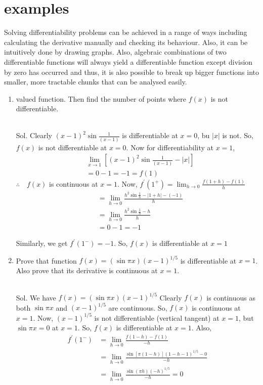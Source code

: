 \section{examples}

Solving differentiability problems can be achieved in a range of ways including calculating the derivative manually and checking its behaviour. Also, it can be intuitively done by drawing graphs. Also, algebraic combinations of two differentiable functions will always yield a differentiable function except division by zero has occurred and thus, it is also possible to break up bigger functions into smaller, more tractable chunks that can be analysed easily. 

\begin{enumerate}
\item valued function. Then find the number of points where $f(x)$ is not differentiable.\\\\


\begin{outline}
    Sol. Clearly $(x-1)^2 \sin \frac{1}{(x-1)}$ is differentiable at $x=0$, bu $|x|$ is not.
So, $f(x)$ is not differentiable at $x=0$.
Now for differentiability at $x=1$,
$$
\begin{aligned}
& \lim _{x \rightarrow 1}\left[(x-1)^2 \sin \frac{1}{(x-1)}-|x|\right] \\
& =0-1=-1=f(1)
\end{aligned}
$$
$\therefore \quad f(x)$ is continuous at $x=1$.
Now, $f^{\prime}\left(1^{+}\right)=\lim _{h \rightarrow 0} \frac{f(1+h)-f(1)}{h}$
$$
\begin{aligned}
& =\lim _{h \rightarrow 0} \frac{h^2 \sin \frac{1}{h}-|1+h|-(-1)}{h} \\
& =\lim _{h \rightarrow 0} \frac{h^2 \sin \frac{1}{h}-h}{h} \\
& =0-1=-1
\end{aligned}
$$

Similarly, we get $f^{\prime}\left(1^{-}\right)=-1$.
So, $f(x)$ is differentiable at $x=1$
\end{outline}

\item Prove that function $f(x)=(\sin \pi x)(x-1)^{1 / 5}$ is differentiable at $x=1$. Also prove that its derivative is continuous at $x=1$.\\\\

\begin{outline}
    Sol. We have $f(x)=(\sin \pi x)(x-1)^{1 / 5}$
Clearly $f(x)$ is continuous as both $\sin \pi x$ and $(x-1)^{1 / 5}$ are continuous.
So, $f(x)$ is continuous at $x=1$.
Now, $(x-1)^{1 / 5}$ is not differentiable (vertical tangent) at $x=1$, but $\sin \pi x=0$ at $x=1$.
So, $f(x)$ is differentiable at $x=1$.
Also,
$$
\begin{aligned}
f^{\prime}\left(1^{-}\right) & =\lim _{h \rightarrow 0} \frac{f(1-h)-f(1)}{-h} \\
& =\lim _{h \rightarrow 0} \frac{\sin [\pi(1-h)](1-h-1)^{1 / 5}-0}{-h} \\
& =\lim _{h \rightarrow 0} \frac{\sin (\pi h)(-h)^{1 / 5}}{-h}=0
\end{aligned}
$$


\end{outline}
\end{enumerate}
